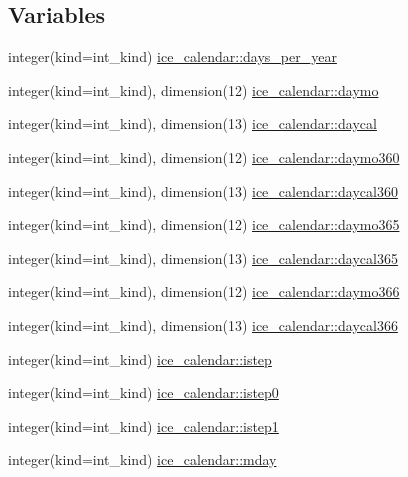 \subsection*{Variables}
\begin{DoxyCompactItemize}
\item 
integer(kind=int\_\-kind) \hyperlink{namespaceice__calendar_a1fa9382761e78de77e0109c55630554b}{ice\_\-calendar::days\_\-per\_\-year}
\item 
integer(kind=int\_\-kind), dimension(12) \hyperlink{namespaceice__calendar_a1d4afbbddfef91146892cd47f6734b77}{ice\_\-calendar::daymo}
\item 
integer(kind=int\_\-kind), dimension(13) \hyperlink{namespaceice__calendar_ab55e85b8212a213de225f16289d5bb75}{ice\_\-calendar::daycal}
\item 
integer(kind=int\_\-kind), dimension(12) \hyperlink{namespaceice__calendar_aa23a9d5a11d0cd15e84d3b9771338ad5}{ice\_\-calendar::daymo360}
\item 
integer(kind=int\_\-kind), dimension(13) \hyperlink{namespaceice__calendar_ad91c534442e93775fa9630bdaa9da806}{ice\_\-calendar::daycal360}
\item 
integer(kind=int\_\-kind), dimension(12) \hyperlink{namespaceice__calendar_abd42cdcd4849fa25afe07f9e672c677e}{ice\_\-calendar::daymo365}
\item 
integer(kind=int\_\-kind), dimension(13) \hyperlink{namespaceice__calendar_a080909b268176fb29d513a184cc30386}{ice\_\-calendar::daycal365}
\item 
integer(kind=int\_\-kind), dimension(12) \hyperlink{namespaceice__calendar_a5db58762f256066e2e55974bc51b0b1e}{ice\_\-calendar::daymo366}
\item 
integer(kind=int\_\-kind), dimension(13) \hyperlink{namespaceice__calendar_a19cae1dafbfb758fdfe8ee3378a033ef}{ice\_\-calendar::daycal366}
\item 
integer(kind=int\_\-kind) \hyperlink{namespaceice__calendar_a6899d76938ada3889a62308eb41331bf}{ice\_\-calendar::istep}
\item 
integer(kind=int\_\-kind) \hyperlink{namespaceice__calendar_a225919cc1367b6648a33740b98427512}{ice\_\-calendar::istep0}
\item 
integer(kind=int\_\-kind) \hyperlink{namespaceice__calendar_a56f19d1b69c0acd3d8fd3a6f06855e48}{ice\_\-calendar::istep1}
\item 
integer(kind=int\_\-kind) \hyperlink{namespaceice__calendar_af65b8e64abed62d107827ade781bb968}{ice\_\-calendar::mday}
\item 

\end{DoxyCompactItemize}
